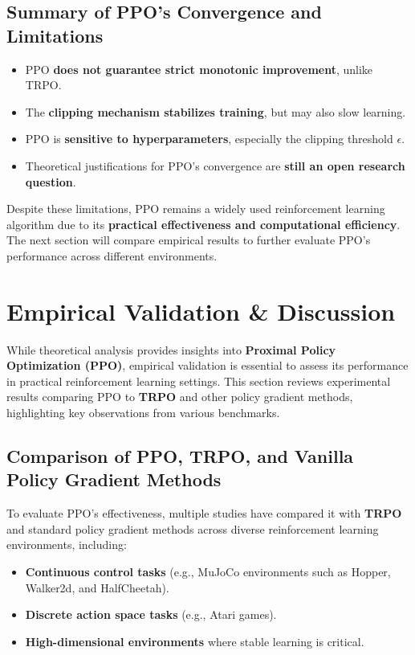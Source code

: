 \documentclass[12pt]{extreport} %
\begin{document}
\subsection{\textbf{Summary of PPO's Convergence and Limitations}}
\begin{itemize}
    \item  PPO \textbf{does not guarantee strict monotonic improvement}, unlike TRPO.
    \item The \textbf{clipping mechanism stabilizes training}, but may also slow learning.
    \item PPO is \textbf{sensitive to hyperparameters}, especially the clipping threshold \( \epsilon \).
    \item Theoretical justifications for PPO's convergence are \textbf{still an open research question}.
\end{itemize}

Despite these limitations, PPO remains a widely used reinforcement learning algorithm due to its \textbf{practical effectiveness and computational efficiency}. The next section will compare empirical results to further evaluate PPO's performance across different environments.

\section{\textbf{Empirical Validation \& Discussion}}

While theoretical analysis provides insights into \textbf{Proximal Policy Optimization (PPO)}, empirical validation is essential to assess its performance in practical reinforcement learning settings. This section reviews experimental results comparing PPO to \textbf{TRPO} and other policy gradient methods, highlighting key observations from various benchmarks.

\subsection{\textbf{Comparison of PPO, TRPO, and Vanilla Policy Gradient Methods}}

To evaluate PPO's effectiveness, multiple studies have compared it with \textbf{TRPO} and standard policy gradient methods across diverse reinforcement learning environments, including:

\begin{itemize}
    \item \textbf{Continuous control tasks} (e.g., MuJoCo environments such as Hopper, Walker2d, and HalfCheetah).
    \item \textbf{Discrete action space tasks} (e.g., Atari games).
    \item \textbf{High-dimensional environments} where stable learning is critical.
\end{itemize}
\end{document}

